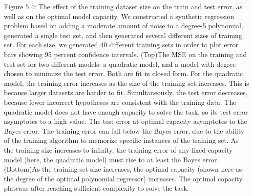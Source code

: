 \documentclass[11pt]{article}
\begin{document}
Figure 5.4: The eﬀect of the training dataset size on the train and test error, as well as
on the optimal model capacity. We constructed a synthetic regression problem based on
adding a moderate amount of noise to a degree-5 polynomial, generated a single test set,
and then generated several diﬀerent sizes of training set. For each size, we generated 40
diﬀerent training sets in order to plot error bars showing 95 percent conﬁdence intervals.
(Top)The MSE on the training and test set for two diﬀerent models: a quadratic model,
and a model with degree chosen to minimize the test error. Both are ﬁt in closed form. For
the quadratic model, the training error increases as the size of the training set increases.
This is because larger datasets are harder to ﬁt. Simultaneously, the test error decreases,
because fewer incorrect hypotheses are consistent with the training data. The quadratic
model does not have enough capacity to solve the task, so its test error asymptotes to
a high value. The test error at optimal capacity asymptotes to the Bayes error. The
training error can fall below the Bayes error, due to the ability of the training algorithm
to memorize speciﬁc instances of the training set. As the training size increases to inﬁnity,
the training error of any ﬁxed-capacity model (here, the quadratic model) must rise to at
least the Bayes error. (Bottom)As the training set size increases, the optimal capacity
(shown here as the degree of the optimal polynomial regressor) increases. The optimal
capacity plateaus after reaching suﬃcient complexity to solve the task.
\end{document}
